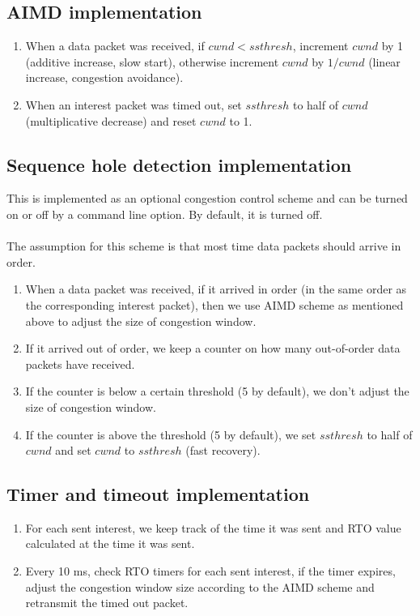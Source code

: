 \documentclass[10pt]{article}
\begin{document}
\subsection{AIMD implementation}

\begin{enumerate}
\item When a data packet was received, if $cwnd < ssthresh$, increment
  $cwnd$ by 1 (additive increase, slow start), otherwise increment
  $cwnd$ by $1/cwnd$ (linear increase, congestion avoidance).
\item When an interest packet was timed out, set $ssthresh$ to half of
  $cwnd$ (multiplicative decrease) and reset $cwnd$ to 1.
\end{enumerate}

\subsection{Sequence hole detection implementation}

This is implemented as an optional congestion control scheme and can
be turned on or off by a command line option. By default, it is turned
off.\\\\
The assumption for this scheme is that most time data packets should
arrive in order.

\begin{enumerate}
\item When a data packet was received, if it arrived in order (in the
  same order as the corresponding interest packet), then we use AIMD
  scheme as mentioned above to adjust the size of congestion window.
\item If it arrived out of order, we keep a counter on how many
  out-of-order data packets have received.
\item If the counter is below a certain threshold (5 by default), we
  don't adjust the size of congestion window.
\item If the counter is above the threshold (5 by default), we set
  $ssthresh$ to half of $cwnd$ and set $cwnd$ to $ssthresh$ (fast recovery).
\end{enumerate}

\subsection{Timer and timeout implementation}

\begin{enumerate}
\item For each sent interest, we keep track of the time it was
  sent and RTO value calculated at the time it was sent.
\item Every 10 ms, check RTO timers for each sent interest, if the
  timer expires, adjust the congestion window size according to the
  AIMD scheme and retransmit the timed out packet.
\end{enumerate}
\end{document}
